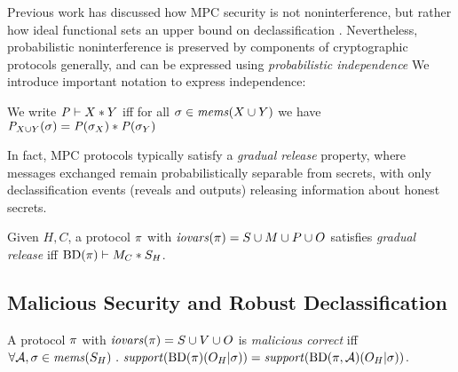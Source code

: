 Previous work has discussed how MPC security is not noninterference,
but rather how ideal functional sets an upper bound on
declassification \cite{6266151,almeida2018enforcing}. Nevertheless,
probabilistic noninterference is preserved by components of
cryptographic protocols generally, and can be expressed using
\emph{probabilistic independence} \cite{darais2019language,barthe2019probabilistic}
We introduce important notation to express independence:
\begin{definition}
  We write $\mathit{P} \vdash X * Y$ iff for all
    $\sigma \in \mathit{mems}(X \cup Y)$ we have
  ${\mathit{P}}_{X \cup Y}(\sigma) =
  \mathit{P}(\sigma_X) * \mathit{P}(\sigma_Y)$
\end{definition}

In fact, MPC protocols typically satisfy a \emph{gradual release}
property\cite{XXX}, where messages exchanged remain probabilistically separable
from secrets, with only declassification events (reveals and outputs)
releasing information about honest secrets. 
\begin{definition}
  Given $H,C$, a protocol $\pi$ with $\mathit{iovars}(\pi) = S \cup M \cup P \cup O$
  satisfies \emph{gradual release} iff
  $\mathrm{BD}(\pi) \vdash M_C * S_H$.
\end{definition}

\subsection{Malicious Security and Robust Declassification}



\begin{definition}
  A protocol $\pi$ with $\mathit{iovars}(\pi) = S \cup V \cup O$ is \emph{malicious correct} iff
  $
  \forall \adversary, \store \in \mems(S_H) \ .\ \support(\progtt(\prog)(O_H|\store)) =
    \support(\progtt(\prog,\adversary)(O_H|\store))
  $.
\end{definition}

